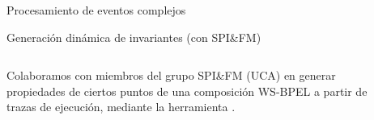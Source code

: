 \documentclass[usepdftitle=false,xcolor={svgnames}]{beamer}
\newcommand*{\herramienta}[1]{\textbf{\structure{#1}}}
\begin{document}
\begin{frame}{}
\begin{columns}[T]
\begin{column}{.45\textwidth}
\begin{block}{Procesamiento de eventos complejos}
        \vspace{1em}

        \begin{center}
          \scriptsize 
        \end{center}
      \end{block}

      \vspace{-.1em}

      \begin{block}{Generación dinámica de invariantes (con SPI\&FM)}
        \begin{columns}

           \small Colaboramos con miembros del
          grupo SPI\&FM (UCA) en generar propiedades de ciertos puntos
          de una composición WS-BPEL a partir de trazas de ejecución,
          mediante la herramienta
          \href{http://neptuno.uca.es/~takuan}{\herramienta{Takuan}}.

          \begin{center}
            \scriptsize \def\svgwidth{\textwidth}
            
          \end{center}
        \end{columns}
      \end{block}
    \end{column}
  \end{columns}

\end{frame}
\end{document}
